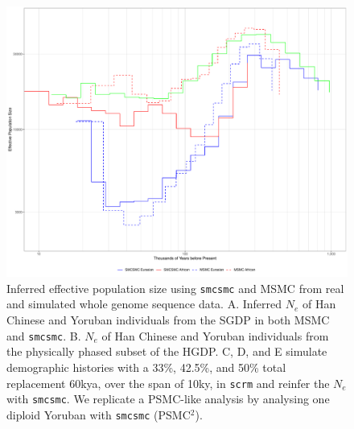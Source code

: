 \documentclass{article}
\begin{document}
\begin{figure}
	\centering
	\includegraphics[width=\textwidth]{../plot/ne/figure.pdf}
	\caption{Inferred effective population size using {\tt smcsmc} and MSMC from real and simulated whole genome sequence data. A. Inferred $N_e$ of Han Chinese and Yoruban individuals from the SGDP in both MSMC and {\tt smcsmc}. B. $N_e$ of Han Chinese and Yoruban individuals from the physically phased subset of the HGDP. C, D, and E simulate demographic histories with a 33\%, 42.5\%, and 50\% total replacement 60kya, over the span of 10ky, in {\tt scrm} and reinfer the $N_e$ with {\tt smcsmc}. We replicate a PSMC-like analysis by analysing one diploid Yoruban with {\tt smcsmc} (PSMC$^2$).}
	\label{neplot}
\end{figure}

\end{document}
